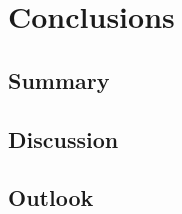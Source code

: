 \chapter{Conclusions}
\label{chap:conclusions}

\section{Summary}
\section{Discussion}
\section{Outlook}